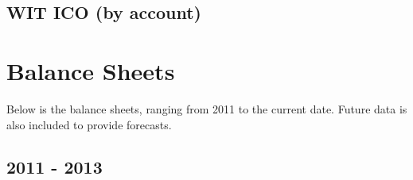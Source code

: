 \documentclass[letterpaper,10pt,english]{sphinxmanual}
\begin{document}
\subsection{WIT ICO (by account)}
\label{\detokenize{lenders:wit-ico-by-account}}

\section{Balance Sheets}
\label{\detokenize{balancesheet2:balance-sheets}}\label{\detokenize{balancesheet2::doc}}
Below is the balance sheets, ranging from 2011 to the current date. Future data is also included to provide forecasts.


\subsection{2011 - 2013}
\label{\detokenize{balancesheet2:id1}}
\end{document}

